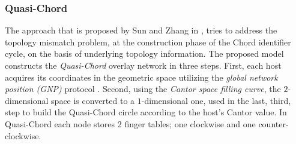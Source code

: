 \subsubsection{Quasi-Chord}
The approach that is proposed by Sun and Zhang in \cite{SZ2008}, tries
to address the topology mismatch problem, at the construction phase of the
Chord identifier cycle, on the basis of underlying topology information.
The proposed model constructs the \emph{Quasi-Chord} overlay network in three
steps. First, each host acquires its coordinates in the geometric space
utilizing the \emph{global network position (GNP)} protocol \cite{ng_gnp_2001}.
Second, using the \emph{Cantor space filling curve}, the $2$-dimensional space
is converted to a $1$-dimensional one, used in the last, third, step to build
the Quasi-Chord circle according to the host's Cantor value. In Quasi-Chord
each node stores 2 finger tables; one clockwise and one counter-clockwise.

